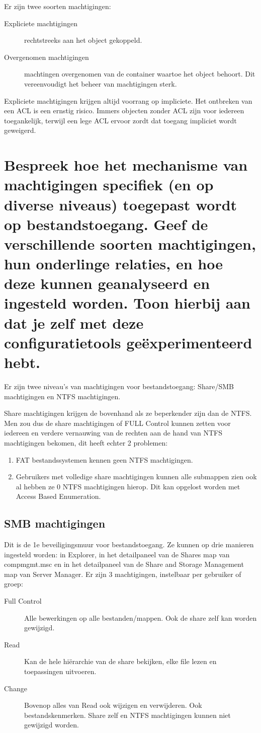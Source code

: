 Er zijn twee soorten machtigingen:
\begin{description}
	\item[Expliciete machtigingen] rechtstreeks aan het object gekoppeld.
	\item[Overgenomen machtigingen] machtingen overgenomen van de container
		waartoe het object behoort. Dit vereenvoudigt het beheer van
		machtigingen sterk.
\end{description}

Expliciete machtigingen krijgen altijd voorrang op impliciete. Het ontbreken van
een ACL is een ernstig risico. Immers objecten zonder ACL zijn voor iedereen
toegankelijk, terwijl een lege ACL ervoor zordt dat toegang impliciet wordt
geweigerd.

\section{Bespreek hoe het mechanisme van machtigingen specifiek (en op diverse
niveaus) toegepast wordt op bestandstoegang. Geef de verschillende soorten
machtigingen, hun onderlinge relaties, en hoe deze kunnen geanalyseerd en
ingesteld worden. Toon hierbij aan dat je zelf met deze configuratietools
geëxperimenteerd hebt.}

Er zijn twee niveau's van machtigingen voor bestandstoegang: Share/SMB
machtigingen en NTFS machtigingen.

Share machtigingen krijgen de bovenhand als ze beperkender zijn dan de NTFS. Men
zou dus de share machtigingen of FULL Control kunnen zetten voor iedereen en
verdere vernauwing van de rechten aan de hand van NTFS machtigingen bekomen, dit
heeft echter 2 problemen:
\begin{enumerate}
	\item FAT bestandssystemen kennen geen NTFS machtigingen.
	\item Gebruikers met volledige share machtigingen kunnen alle submappen
		zien ook al hebben ze 0 NTFS machtigingen hierop. Dit kan
		opgelost worden met Access Based Enumeration.
\end{enumerate}

\subsection{SMB machtigingen}

Dit is de 1e beveiligingsmuur voor bestandstoegang. Ze kunnen op drie manieren
ingesteld worden: in Explorer, in het detailpaneel van de Shares map van
compmgmt.msc en in het detailpaneel van de Share and Storage Management map van
Server Manager. Er zijn 3 machtigingen, instelbaar per gebruiker of groep:
\begin{description}
	\item[Full Control] Alle bewerkingen op alle bestanden/mappen. Ook de
		share zelf kan worden gewijzigd.
	\item[Read] Kan de hele hiërarchie van de share bekijken, elke file
		lezen en toepassingen uitvoeren.
	\item[Change] Bovenop alles van Read ook wijzigen en verwijderen. Ook
		bestandskenmerken. Share zelf en NTFS machtigingen kunnen niet
		gewijzigd worden.
\end{description}

